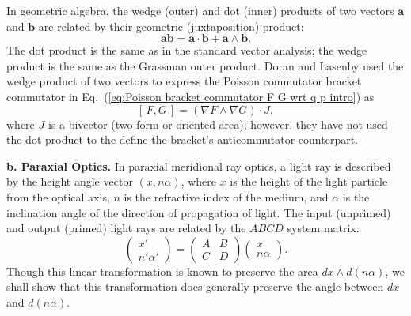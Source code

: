 \documentclass[11pt,twocolumn]{article}
\begin{document}
In geometric algebra, the wedge (outer) and dot (inner) products of two vectors $\mathbf a$ and $\mathbf b$ are related by their geometric (juxtaposition) product\cite{Hestenes_2003_ajpv71i2pp104-121_p107}:
\begin{equation}
\label{eq:ab is a dot b + a wedge b intro}
\mathbf a\mathbf b=\mathbf a\cdot\mathbf b+\mathbf a\wedge\mathbf b.
\end{equation}
The dot product is the same as in the standard vector analysis; the wedge product is the same as the Grassman outer product\cite{Doran_1993_jmathphysv4i8_pp3642-3669_sec2eq1-2}.  Doran and Lasenby used the wedge product of two vectors to express the Poisson commutator bracket commutator in Eq.~(\ref{eq:Poisson bracket commutator F G wrt q p intro}) as\cite{DoranLasenby_2003_GeometricAlgebraforPhysicists_p436}
\begin{equation}
\label{eq:F commutator G Poisson geometric algebra intro}
[\,F,G\,]=(\nabla F\wedge\nabla G)\cdot J,
\end{equation}
where $J$ is a bivector (two form or oriented area); however, they have not used the dot product to the define the bracket's anticommutator counterpart.  

\textbf{b. Paraxial Optics.}  In paraxial meridional ray optics, a light ray is described by the height angle vector $(x,n\alpha)$,
where $x$ is the height of the light particle from the optical axis, $n$ is the refractive index of the medium, and $\alpha$ is the inclination angle of the direction of propagation of light.  The input (unprimed) and output (primed) light rays are related by the $ABCD$ system matrix:\cite{NazarathyShamir_1982_josav72i3pp356-364_p358}
\begin{equation}
\label{eq:r is M r intro}
\begin{pmatrix}
x'\\
n'\alpha'
\end{pmatrix}
=
\begin{pmatrix}
A&B\\
C&D
\end{pmatrix}
\begin{pmatrix}
x\\
n\alpha
\end{pmatrix}.
\end{equation}
Though this linear transformation is known to preserve the area $dx\wedge d(n\alpha)$, we shall show that this transformation does generally preserve the angle between $dx$ and $d(n\alpha)$.
\end{document}
